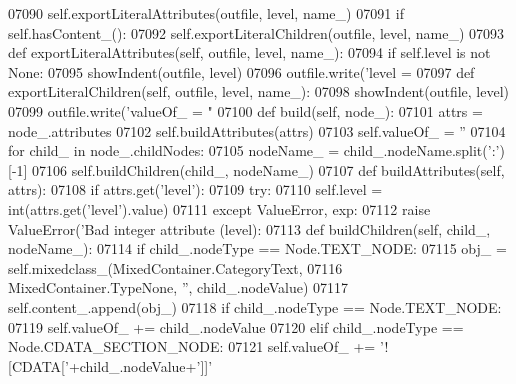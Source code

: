 \begin{DoxyCode}
{{{{{{{{{{{{{{{{{{{{{{{{{{{{{{{{{{{{{{{{{{{{{{{{{{{{{{{{{{{{{{{{{{{{{{{{{{{{{{{{{{{{{{{{{{{{{{{{{{{{{{{{{{{{{{{{{{{{{{{{{{{{{{{{{{{{{{{{{{{{{{{{{{{{{{{{{{{{{{{{{{{{{{{{{{{{{{{{{{{{{{{{{{{{{{{{{{{{{{{{{{{{{{{{{{{{{{{{{{{{{{{{{{{{{{{{{{{{{{{{{{{{{{{{{{{{{{{{{{{{{{{{{{{{{{{{{{{{{{{{{{{{{{{{{{{{{{{{{{{{{{{{{{{{{{{{{{{{{{{{{{{{{{{{{{{{{{{{{{{{{{{{{{{{{{{{{{{{{{{{{{{{{{{{{{{{{{{{{{{{{{{{{{{{{{{{{{{{{{{{{{{{{{{{{{{{{{{{{{{{{{{{{{{{{{{{{{{{{{07090         self.exportLiteralAttributes(outfile, level, name\_)
07091         \textcolor{keywordflow}{if} self.hasContent_():
07092             self.exportLiteralChildren(outfile, level, name\_)
07093     \textcolor{keyword}{def }exportLiteralAttributes(self, outfile, level, name\_):
07094         \textcolor{keywordflow}{if} self.level \textcolor{keywordflow}{is} \textcolor{keywordflow}{not} \textcolor{keywordtype}{None}:
07095             showIndent(outfile, level)
07096             outfile.write(\textcolor{stringliteral}{'level = %
07097     \textcolor{keyword}{def }exportLiteralChildren(self, outfile, level, name\_):
07098         showIndent(outfile, level)
07099         outfile.write(\textcolor{stringliteral}{'valueOf\_ = "%
07100     \textcolor{keyword}{def }build(self, node\_):
07101         attrs = node\_.attributes
07102         self.buildAttributes(attrs)
07103         self.valueOf_ = \textcolor{stringliteral}{''}
07104         \textcolor{keywordflow}{for} child\_ \textcolor{keywordflow}{in} node\_.childNodes:
07105             nodeName\_ = child\_.nodeName.split(\textcolor{stringliteral}{':'})[-1]
07106             self.buildChildren(child\_, nodeName\_)
07107     \textcolor{keyword}{def }buildAttributes(self, attrs):
07108         \textcolor{keywordflow}{if} attrs.get(\textcolor{stringliteral}{'level'}):
07109             \textcolor{keywordflow}{try}:
07110                 self.level = int(attrs.get(\textcolor{stringliteral}{'level'}).value)
07111             \textcolor{keywordflow}{except} ValueError, exp:
07112                 \textcolor{keywordflow}{raise} ValueError(\textcolor{stringliteral}{'Bad integer attribute (level): %
07113     \textcolor{keyword}{def }buildChildren(self, child\_, nodeName\_):
07114         \textcolor{keywordflow}{if} child\_.nodeType == Node.TEXT\_NODE:
07115             obj\_ = self.mixedclass_(MixedContainer.CategoryText,
07116                 MixedContainer.TypeNone, \textcolor{stringliteral}{''}, child\_.nodeValue)
07117             self.content\_.append(obj\_)
07118         \textcolor{keywordflow}{if} child\_.nodeType == Node.TEXT\_NODE:
07119             self.valueOf_ += child\_.nodeValue
07120         \textcolor{keywordflow}{elif} child\_.nodeType == Node.CDATA\_SECTION\_NODE:
07121             self.valueOf_ += \textcolor{stringliteral}{'![CDATA['}+child\_.nodeValue+\textcolor{stringliteral}{']]'}
}}}}}}}}}}}}}}}}}}}}}}}}}}}}}}}}}}}}}}}}}}}}}}}}}}}}}}}}}}}}}}}}}}}}}}}}}}}}}}}}}}}}}}}}}}}}}}}}}}}}}}}}}}}}}}}}}}}}}}}}}}}}}}}}}}}}}}}}}}}}}}}}}}}}}}}}}}}}}}}}}}}}}}}}}}}}}}}}}}}}}}}}}}}}}}}}}}}}}}}}}}}}}}}}}}}}}}}}}}}}}}}}}}}}}}}}}}}}}}}}}}}}}}}}}}}}}}}}}}}}}}}}}}}}}}}}}}}}}}}}}}}}}}}}}}}}}}}}}}}}}}}}}}}}}}}}}}}}}}}}}}}}}}}}}}}}}}}}}}}}}}}}}}}}}}}}}}}}}}}}}}}}}}}}}}}}}}}}}}}}}}}}}}}}}}}}}}}}}}}}}}}}}}}}}}}}}}}}}}}}}}}}}}}}}}}}}}}}}}}}}
\end{DoxyCode}
